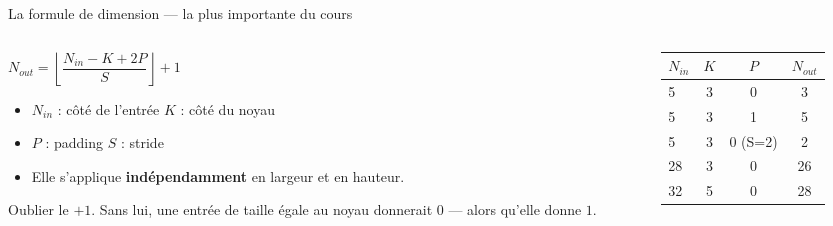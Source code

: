 \begin{frame}{La formule de dimension --- la plus importante du cours}
\begin{columns}[t]
\begin{column}{0.52\textwidth}
\begin{center}
\large
$N_{out} = \left\lfloor \dfrac{N_{in} - K + 2P}{S} \right\rfloor + 1$
\end{center}
\vspace{2mm}
\begin{itemize}
  \item $N_{in}$ : côté de l'entrée \quad $K$ : côté du noyau
  \item $P$ : padding \quad $S$ : stride
  \item Elle s'applique \textbf{indépendamment} en largeur et en hauteur.
\end{itemize}
\begin{wbox}
Oublier le $+1$. Sans lui, une entrée de taille égale au noyau donnerait
$0$ --- alors qu'elle donne $1$.
\end{wbox}
\end{column}
\begin{column}{0.44\textwidth}
\begin{ebox}
\begin{center}
\begin{tabular}{@{}lccc@{}}
\toprule
$N_{in}$ & $K$ & $P$ & $N_{out}$ \\
\midrule
5 & 3 & 0 & 3 \\
5 & 3 & 1 & 5 \\
5 & 3 & 0 (S=2) & 2 \\
28 & 3 & 0 & 26 \\
32 & 5 & 0 & 28 \\
\bottomrule
\end{tabular}
\end{center}
\end{ebox}
\end{column}
\end{columns}
\end{frame}

